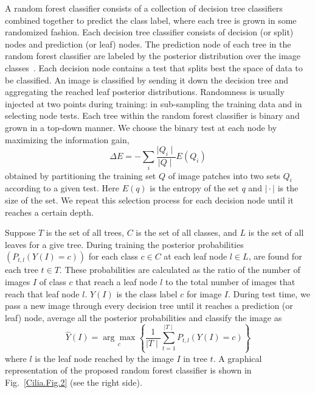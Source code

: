 A random forest classifier consists of a collection of decision tree classifiers combined together to predict the class label, where each tree is grown in some randomized fashion. Each decision tree classifier consists of decision (or split) nodes and prediction (or leaf) nodes. The prediction node of each tree in the random forest classifier are labeled by the posterior distribution over the image classes~\cite{bosch_Image_2007}. Each decision node contains a test that splits best the space of data to be classified. An image is classified by sending it down the decision tree and aggregating the reached leaf posterior distributions. Randomness is usually injected at two points during training: in sub-sampling the training data and in selecting node tests. Each tree within the random forest classifier is binary and grown in a top-down manner. We choose the binary test at each node by maximizing the information gain,
\begin{equation}
\Delta E = -\sum_{i}\frac{\mid Q_{i}\mid}{\mid Q\mid}E(Q_{i})
\label{Cilia.Eq.2}
\end{equation}
obtained by partitioning the training set $Q$ of image patches into two sets $Q_{i}$ according to a given test. Here $E(q)$ is the entropy of the set $q$ and $\mid \cdot\mid$ is the size of the set. We repeat this selection process for each decision node until it reaches a certain depth.

Suppose $T$ is the set of all trees, $C$ is the set of all classes, and $L$ is the set of all leaves for a give tree. During training the posterior probabilities $\left(P_{t,l}(Y(I) = c)\right)$ for each class $c \in C$ at each leaf node $l \in L$, are found for each tree $t \in T$. These probabilities are calculated as the ratio of the number of images $I$ of class $c$ that reach a leaf node $l$ to the total number of images that reach that leaf node $l$. $Y(I)$ is the class label $c$ for image $I$. During test time, we pass a new image through every decision tree until it reaches a prediction (or leaf) node, average all the posterior probabilities and classify the image as
\begin{equation}
\hat{Y}(I) = \underset{c}{\arg \max}\left\{\frac{1}{\mid T\mid}\sum_{t=1}^{\mid T\mid} P_{t,l}(Y(I) = c)\right\}
\label{Cilia.Eq.3}
\end{equation}
where $l$ is the leaf node reached by the image $I$ in tree $t$. A graphical representation of the proposed random forest classifier is shown in Fig.~\ref{Cilia.Fig.2} (see the right side).

